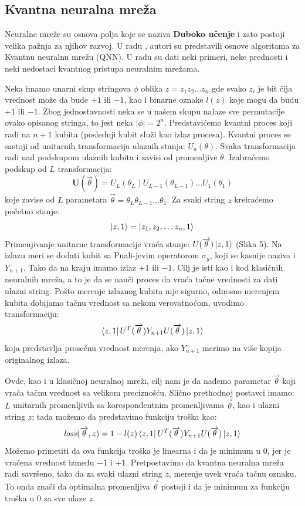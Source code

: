 \documentclass[12pt, letterpaper, oneside]{article}
\begin{document}
\subsection{Kvantna neuralna mreža}
Neuralne mreže su osnova polja koje se naziva \textbf{Duboko učenje} i zato postoji velika pažnja za njihov razvoj.
U radu \cite{Classification_wit_QNN}, autori su predstavili osnove algoritama za Kvantnu neuralnu mrežu (QNN).
U radu su dati neki primeri, neke prednosti i neki nedostaci kvantnog pristupa neuralnim mrežama.

Neka imamo unarni skup stringova $\phi$ oblika $z=z_1 z_2 \dots z_n$ gde svako $z_i$ je bit čija vrednost može da bude $+1$ ili $-1$,
kao i binarne oznake $l(z)$ koje mogu da budu $+1$ ili $-1$. Zbog jednostavnosti neka se u našem skupu nalaze sve permutacije ovako opisanog stringa, to jest neka $|\phi|=2^n$.
Predstavićemo kvantni proces koji radi na $n+1$ kubita (poslednji kubit služi kao izlaz procesa). Kvantni proces se sastoji od unitarnih transformacija ulaznih stanja: ${U_a(\theta)}$.
Svaka transformacija radi nad podskupom ulaznih kubita i zavisi od promenljive $\theta$. Izabraćemo podskup od $L$ transformacija:
\[
  \mathbf{U}(\overrightarrow{\theta}) = U_{L}(\theta_{L}) U_{L-1}(\theta_{L-1}) \dots U_{1}(\theta_{1}) 
\]
koje zavise od $L$ parametara $\overrightarrow{\theta}=\theta_{L} \theta_{L-1} \dots \theta_{1}$. Za svaki string $z$ kreiraćemo početno stanje:
\[
    \Ket{z,1} = \Ket{z_1, z_2, \dots z_n, 1}
\]
Primenjivanje unitarne transformacije vraća stanje: $U(\overrightarrow{\theta})\Ket{z,1}$ (Slika 5).
Na izlazu meri se dodati kubit sa Puali-jevim operatorom $\sigma_y$, koji se kasnije naziva i $Y_{n+1}$.
Tako da na kraju imamo izlaz $+1$ ili $-1$. Cilj je isti kao i kod klasičnih neuralnih mreža, a to je da se nauči proces da vraća tačne vrednosti za dati ulazni string.
Pošto merenje izlaznog kubita nije sigurno, odnosno merenjem kubita dobijamo tačnu vrednost sa nekom verovatnoćom, uvodimo transformaciju:
\[
    \bra{z,1}U^T(\overrightarrow{\theta})Y_{n+1}U(\overrightarrow{\theta})\Ket{z,1}
\]
koja predstavlja prosečnu vrednost merenja, ako $Y_{n+1}$ merimo na više kopija originalnog izlaza.

Ovde, kao i u klasičnoj neuralnoj mreži, cilj nam je da nađemo parametar $\overrightarrow{\theta}$ koji vraća tačnu vrednost sa velikom preciznošću.
Slično prethodnoj postavci imamo: $L$ unitarnih promenljivih sa korespondentnim promenljivama $\overrightarrow{\theta}$, kao i ulazni string $z$; 
tada možemo da predstavimo funkciju troška kao:
\[
    \mathit{loss}(\overrightarrow{\theta},z) = 1 - l(z)\bra{z,1}U^T(\overrightarrow{\theta})Y_{n+1}U(\overrightarrow{\theta})\Ket{z,1}
\]
Možemo primetiti da ova funkcija troška je linearna i da je minimum u $0$, jer je vraćena vrednost između $-1$ i $+1$.
Pretpostavimo da kvantna neuralna mreža radi savršeno, tako da za svaki ulazni string $z$, merenje uvek vraća tačnu oznaku.
To onda znači da optimalna promenljiva $\overrightarrow{\theta}$ postoji i da je minimum za funkciju troška u $0$ za sve ulaze $z$.
\end{document}

